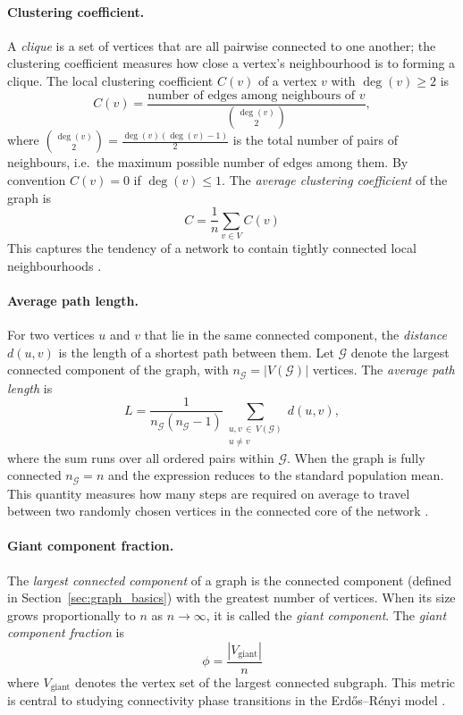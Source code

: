 \documentclass[12pt, a4paper]{report}
\theoremstyle{definition}
\theoremstyle{plain}
\theoremstyle{remark}
\begin{document}
\paragraph{Clustering coefficient.}
A \emph{clique} is a set of vertices that are all pairwise
connected to one another; the clustering coefficient measures
how close a vertex's neighbourhood is to forming a clique.
The local clustering coefficient $C(v)$ of a vertex 
$v$ with $\deg(v) \ge 2$ is
\[
  C(v) =
  \frac{\text{number of edges among neighbours of } v}
       {\binom{\deg(v)}{2}},
\]
where $\binom{\deg(v)}{2} = \frac{\deg(v)(\deg(v)-1)}{2}$ is
the total number of pairs of neighbours, i.e.\ the maximum
possible number of edges among them.
By convention $C(v) = 0$ if $\deg(v) \le 1$. The 
\emph{average clustering coefficient} of the graph is
\begin{equation}
C = \frac{1}{n}\sum_{v \in V} C(v)
\label{eq:clustering}
\end{equation}
This captures the tendency of a network to contain 
tightly connected local neighbourhoods \cite{hofstad2017}.

\paragraph{Average path length.}
For two vertices $u$ and $v$ that lie in the same connected component,
the \emph{distance} $d(u,v)$ is the length of a shortest path between
them.
Let $\mathcal{G}$ denote the largest connected component of the graph,
with $n_{\mathcal{G}} = |V(\mathcal{G})|$ vertices.
The \emph{average path length} is
%
\begin{equation}
L = \frac{1}{n_{\mathcal{G}}(n_{\mathcal{G}}-1)}
    \sum_{\substack{u,v\,\in\,V(\mathcal{G}) \\ u \ne v}} d(u,v),
\label{eq:avg-path}
\end{equation}
%
where the sum runs over all ordered pairs within $\mathcal{G}$.
When the graph is fully connected $n_{\mathcal{G}} = n$ and the
expression reduces to the standard population mean.
This quantity measures how many steps are required on average to
travel between two randomly chosen vertices in the connected core
of the network \cite{hofstad2017, albert2002}.

\paragraph{Giant component fraction.}
The \emph{largest connected component} of a graph is the
connected component (defined in Section~\ref{sec:graph_basics})
with the greatest number of vertices. When its size grows
proportionally to $n$ as $n \to \infty$, it is called the
\emph{giant component}. The \emph{giant component fraction} is
\begin{equation}
\phi = \frac{|V_{\text{giant}}|}{n}
\label{eq:giant-fraction}
\end{equation}
where $V_{\text{giant}}$ denotes the vertex set of the 
largest connected subgraph. This metric is central to 
studying connectivity phase transitions in the 
Erd\H{o}s--R\'enyi model \cite{hofstad2017}.
\end{document}

